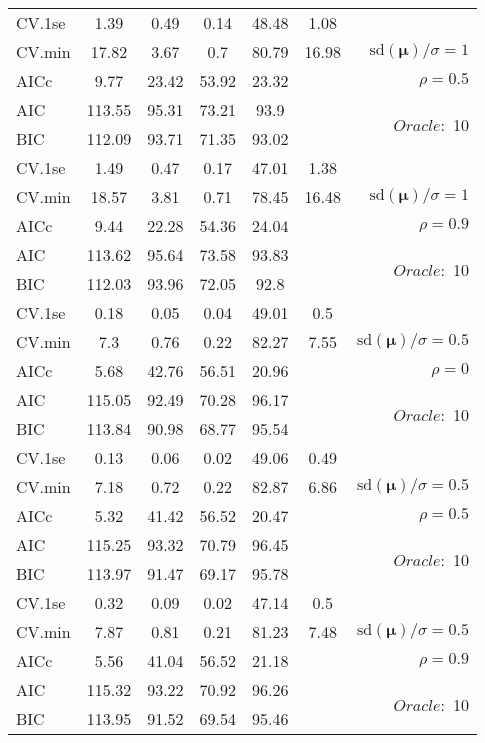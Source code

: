 \begin{table}
\begin{center}
\begin{tabular}{l*{5}{c}|r}
 \hline 
CV.1se & 1.39 & 0.49 & 0.14 & 48.48 & 1.08 & \\
CV.min & 17.82 & 3.67 & 0.7 & 80.79 & 16.98 &  $\mathrm{sd}(\mathbf{\mu})/\sigma=1$ \\
AICc & 9.77 & 23.42 & 53.92 & 23.32 & & $\rho=0.5$ \\
AIC & 113.55 & 95.31 & 73.21 & 93.9 & &  \multirow{2}{*}{$Oracle: $ 10} \\
BIC & 112.09 & 93.71 & 71.35 & 93.02 & &  \\
 \hline 
CV.1se & 1.49 & 0.47 & 0.17 & 47.01 & 1.38 & \\
CV.min & 18.57 & 3.81 & 0.71 & 78.45 & 16.48 &  $\mathrm{sd}(\mathbf{\mu})/\sigma=1$ \\
AICc & 9.44 & 22.28 & 54.36 & 24.04 & & $\rho=0.9$ \\
AIC & 113.62 & 95.64 & 73.58 & 93.83 & &  \multirow{2}{*}{$Oracle: $ 10} \\
BIC & 112.03 & 93.96 & 72.05 & 92.8 & &  \\
 \hline 
CV.1se & 0.18 & 0.05 & 0.04 & 49.01 & 0.5 & \\
CV.min & 7.3 & 0.76 & 0.22 & 82.27 & 7.55 &  $\mathrm{sd}(\mathbf{\mu})/\sigma=0.5$ \\
AICc & 5.68 & 42.76 & 56.51 & 20.96 & & $\rho=0$ \\
AIC & 115.05 & 92.49 & 70.28 & 96.17 & &  \multirow{2}{*}{$Oracle: $ 10} \\
BIC & 113.84 & 90.98 & 68.77 & 95.54 & &  \\
 \hline 
CV.1se & 0.13 & 0.06 & 0.02 & 49.06 & 0.49 & \\
CV.min & 7.18 & 0.72 & 0.22 & 82.87 & 6.86 &  $\mathrm{sd}(\mathbf{\mu})/\sigma=0.5$ \\
AICc & 5.32 & 41.42 & 56.52 & 20.47 & & $\rho=0.5$ \\
AIC & 115.25 & 93.32 & 70.79 & 96.45 & &  \multirow{2}{*}{$Oracle: $ 10} \\
BIC & 113.97 & 91.47 & 69.17 & 95.78 & &  \\
 \hline 
CV.1se & 0.32 & 0.09 & 0.02 & 47.14 & 0.5 & \\
CV.min & 7.87 & 0.81 & 0.21 & 81.23 & 7.48 &  $\mathrm{sd}(\mathbf{\mu})/\sigma=0.5$ \\
AICc & 5.56 & 41.04 & 56.52 & 21.18 & & $\rho=0.9$ \\
AIC & 115.32 & 93.22 & 70.92 & 96.26 & &  \multirow{2}{*}{$Oracle: $ 10} \\
BIC & 113.95 & 91.52 & 69.54 & 95.46 & &  \\
 \hline 
\end{tabular}
\end{center}
\vspace{-1cm}
\end{table}




